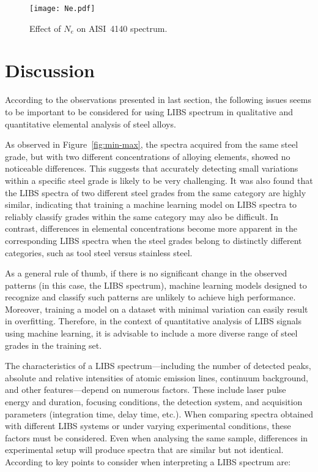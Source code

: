 \documentclass[12pt,a4paper]{article}
\begin{document}
		
	
	\begin{figure}[h!]
		\centering
		\texttt{[image: Ne.pdf]}
		\caption{Effect of $N_e$ on AISI~4140 spectrum.}
		\label{fig:Effect of N_e}
	\end{figure}

	
	\section{Discussion}
	According to the observations presented in last section, the following issues seems to be important to be considered for using LIBS spectrum in qualitative and quantitative elemental analysis of steel alloys. 
	
	As observed in Figure~\ref{fig:min-max}, the spectra acquired from the same steel grade, but with two different concentrations of alloying elements, showed no noticeable differences. This suggests that accurately detecting small variations within a specific steel grade is likely to be very challenging. It was also found that the LIBS spectra of two different steel grades from the same category are highly similar, indicating that training a machine learning model on LIBS spectra to reliably classify grades within the same category may also be difficult. In contrast, differences in elemental concentrations become more apparent in the corresponding LIBS spectra when the steel grades belong to distinctly different categories, such as tool steel versus stainless steel.
	
	
	As a general rule of thumb, if there is no significant change in the observed patterns (in this case, the LIBS spectrum), machine learning models designed to recognize and classify such patterns are unlikely to achieve high performance. Moreover, training a model on a dataset with minimal variation can easily result in overfitting. Therefore, in the context of quantitative analysis of LIBS signals using machine learning, it is advisable to include a more diverse range of steel grades in the training set.
	
	
	The characteristics of a LIBS spectrum---including the number of detected peaks, absolute and relative intensities of atomic emission lines, continuum background, and other features---depend on numerous factors. These include laser pulse energy and duration, focusing conditions, the detection system, and acquisition parameters (integration time, delay time, etc.).  
	When comparing spectra obtained with different LIBS systems or under varying experimental conditions, these factors must be considered. Even when analysing the same sample, differences in experimental setup will produce spectra that are similar but not identical. According to \cite{AppliedPhotonics2019LIBSQualitative} key points to consider when interpreting a LIBS spectrum are:
	
\end{document}
